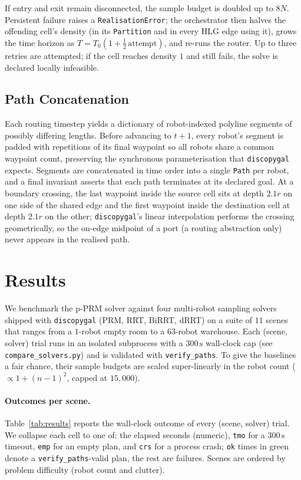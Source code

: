 \documentclass[12pt,a4paper]{article}
\begin{document}
    If entry and exit remain disconnected, the sample budget is doubled up to $8N$.
    Persistent failure raises a \texttt{RealisationError}; the orchestrator then halves the offending cell's density (in its \texttt{Partition} and in every HLG edge using it), grows the time horizon as $T=T_0(1+\tfrac{1}{2}\,\mathrm{attempt})$, and re-runs the router.
    Up to three retries are attempted; if the cell reaches density $1$ and still fails, the solve is declared locally infeasible.

    \subsection{Path Concatenation}
    \label{sec:concat}
    Each routing timestep yields a dictionary of robot-indexed polyline segments of possibly differing lengths. Before advancing to $t{+}1$, every robot's segment is padded with repetitions of its final waypoint so all robots share a common waypoint count, preserving the synchronous parameterisation that \texttt{discopygal} expects. Segments are concatenated in time order into a single \texttt{Path} per robot, and a final invariant asserts that each path terminates at its declared goal. At a boundary crossing, the last waypoint inside the source cell sits at depth $2.1r$ on one side of the shared edge and the first waypoint inside the destination cell at depth $2.1r$ on the other; \texttt{discopygal}'s linear interpolation performs the crossing geometrically, so the on-edge midpoint of a port (a routing abstraction only) never appears in the realised path.


    \section{Results}
    \label{sec:results}
    We benchmark the p-PRM solver against four multi-robot sampling solvers shipped with \texttt{discopygal} (PRM, RRT, BiRRT, dRRT) on a suite of $11$ scenes that ranges from a $1$-robot empty room to a $63$-robot warehouse. Each (scene, solver) trial runs in an isolated subprocess with a $300\,\text{s}$ wall-clock cap (see \texttt{compare\_solvers.py}) and is validated with \texttt{verify\_paths}. To give the baselines a fair chance, their sample budgets are scaled super-linearly in the robot count ($\propto 1+(n-1)^2$, capped at $15{,}000$).

    \paragraph{Outcomes per scene.} Table~\ref{tab:results} reports the wall-clock outcome of every (scene, solver) trial. We collapse each cell to one of: the elapsed seconds (numeric), \texttt{tmo} for a $300\,\text{s}$ timeout, \texttt{emp} for an empty plan, and \texttt{crs} for a process crash; \texttt{ok} times in green denote a \texttt{verify\_paths}-valid plan, the rest are failures. Scenes are ordered by problem difficulty (robot count and clutter).
\end{document}
